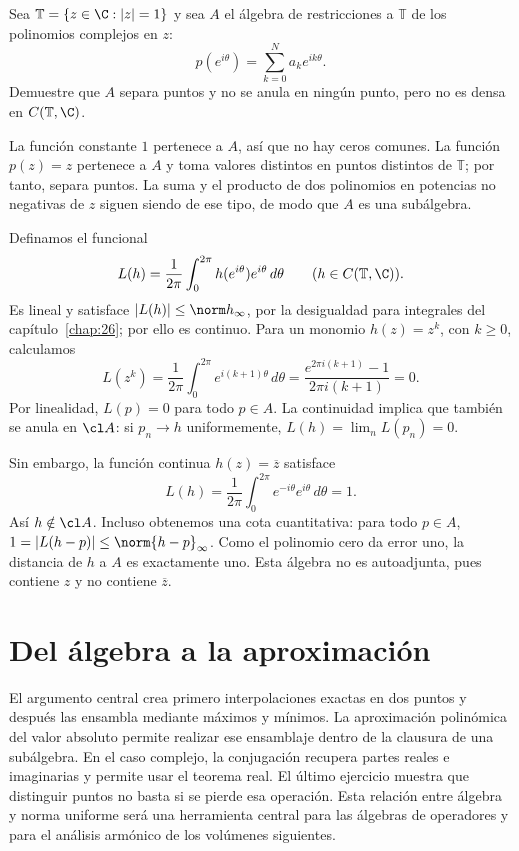 \begin{ejercicio}
Sea $\mathbb T=\{z\in\C:|z|=1\}$ y sea $A$ el álgebra de restricciones a $\mathbb T$ de los polinomios complejos en $z$:
\[
 p(e^{i\theta})=\sum_{k=0}^N a_ke^{ik\theta}.
\]
Demuestre que $A$ separa puntos y no se anula en ningún punto, pero no es densa en $C(\mathbb T,\C)$.
\end{ejercicio}
\begin{solucion}
La función constante $1$ pertenece a $A$, así que no hay ceros comunes. La función $p(z)=z$ pertenece a $A$ y toma valores distintos en puntos distintos de $\mathbb T$; por tanto, separa puntos. La suma y el producto de dos polinomios en potencias no negativas de $z$ siguen siendo de ese tipo, de modo que $A$ es una subálgebra.

Definamos el funcional
\[
 L(h)=\frac1{2\pi}\int_0^{2\pi}h(e^{i\theta})e^{i\theta}\,d\theta
 \qquad(h\in C(\mathbb T,\C)).
\]
Es lineal y satisface $|L(h)|\le\norm h_\infty$, por la desigualdad para integrales del capítulo~\ref{chap:26}; por ello es continuo. Para un monomio $h(z)=z^k$, con $k\ge0$, calculamos
\[
 L(z^k)=\frac1{2\pi}\int_0^{2\pi}e^{i(k+1)\theta}\,d\theta
 =\frac{e^{2\pi i(k+1)}-1}{2\pi i(k+1)}=0.
\]
Por linealidad, $L(p)=0$ para todo $p\in A$. La continuidad implica que también se anula en $\cl A$: si $p_n\to h$ uniformemente, $L(h)=\lim_nL(p_n)=0$.

Sin embargo, la función continua $h(z)=\overline z$ satisface
\[
 L(h)=\frac1{2\pi}\int_0^{2\pi}e^{-i\theta}e^{i\theta}\,d\theta=1.
\]
Así $h\notin\cl A$. Incluso obtenemos una cota cuantitativa: para todo $p\in A$,
$1=|L(h-p)|\le\norm{h-p}_\infty$. Como el polinomio cero da error uno, la distancia de $h$ a $A$ es exactamente uno. Esta álgebra no es autoadjunta, pues contiene $z$ y no contiene $\overline z$.
\end{solucion}

\section{Del álgebra a la aproximación}
El argumento central crea primero interpolaciones exactas en dos puntos y después las ensambla mediante máximos y mínimos. La aproximación polinómica del valor absoluto permite realizar ese ensamblaje dentro de la clausura de una subálgebra. En el caso complejo, la conjugación recupera partes reales e imaginarias y permite usar el teorema real. El último ejercicio muestra que distinguir puntos no basta si se pierde esa operación. Esta relación entre álgebra y norma uniforme será una herramienta central para las álgebras de operadores y para el análisis armónico de los volúmenes siguientes.
